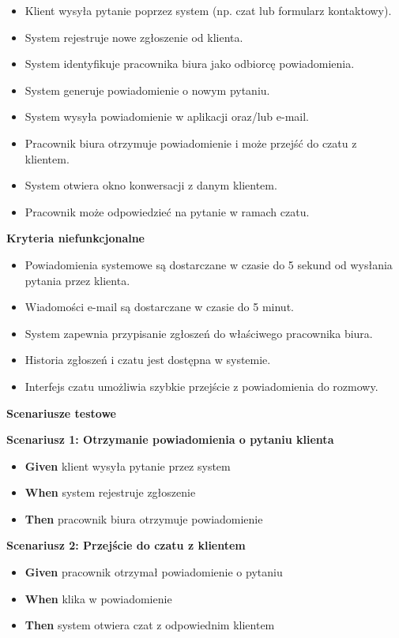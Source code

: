\documentclass[a4paper,12pt]{article}
\begin{document}
\begin{itemize}
    \item Klient wysyła pytanie poprzez system (np. czat lub formularz kontaktowy).
    \item System rejestruje nowe zgłoszenie od klienta.
    \item System identyfikuje pracownika biura jako odbiorcę powiadomienia.
    \item System generuje powiadomienie o nowym pytaniu.
    \item System wysyła powiadomienie w aplikacji oraz/lub e-mail.
    \item Pracownik biura otrzymuje powiadomienie i może przejść do czatu z klientem.
    \item System otwiera okno konwersacji z danym klientem.
    \item Pracownik może odpowiedzieć na pytanie w ramach czatu.
\end{itemize}

\noindent \textbf{Kryteria niefunkcjonalne}
\begin{itemize}
    \item Powiadomienia systemowe są dostarczane w czasie do 5 sekund od wysłania pytania przez klienta.
    \item Wiadomości e-mail są dostarczane w czasie do 5 minut.
    \item System zapewnia przypisanie zgłoszeń do właściwego pracownika biura.
    \item Historia zgłoszeń i czatu jest dostępna w systemie.
    \item Interfejs czatu umożliwia szybkie przejście z powiadomienia do rozmowy.
\end{itemize}

\noindent \textbf{Scenariusze testowe}

\textbf{Scenariusz 1: Otrzymanie powiadomienia o pytaniu klienta}
\begin{itemize}
    \item \textbf{Given} klient wysyła pytanie przez system
    \item \textbf{When} system rejestruje zgłoszenie
    \item \textbf{Then} pracownik biura otrzymuje powiadomienie
\end{itemize}

\textbf{Scenariusz 2: Przejście do czatu z klientem}
\begin{itemize}
    \item \textbf{Given} pracownik otrzymał powiadomienie o pytaniu
    \item \textbf{When} klika w powiadomienie
    \item \textbf{Then} system otwiera czat z odpowiednim klientem
\end{itemize}
\end{document}
